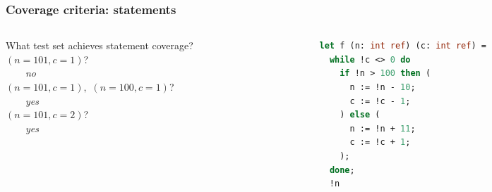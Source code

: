 \documentclass[10pt,xcolor={dvipsnames}]{beamer}
\begin{document}
\begin{frame}[fragile]

\frametitle{Coverage criteria: statements}

\begin{columns}
\begin{column}{0.45\textwidth}
What test set achieves statement coverage?
\\[1em]

\pause
$(n = 101, c = 1)$?
\\
\pause
\ \ \ \ \emph{no}
\\[0.5em]

\pause
$(n = 101, c = 1),$
$(n = 100, c = 1)$?
\\
\pause
\ \ \ \ \emph{yes}
\\[0.5em]

\pause
$(n = 101, c = 2)$?
\\
\pause
\ \ \ \ \emph{yes}
\end{column}

\begin{column}{0.55\textwidth}
\begin{lstlisting}[language=Caml]
let f (n: int ref) (c: int ref) =   
  while !c <> 0 do
    if !n > 100 then (
      n := !n - 10;
      c := !c - 1;
    ) else (
      n := !n + 11;
      c := !c + 1;
    );    
  done;
  !n
\end{lstlisting}
\end{column}

\end{columns}

\end{frame}


\end{document}
